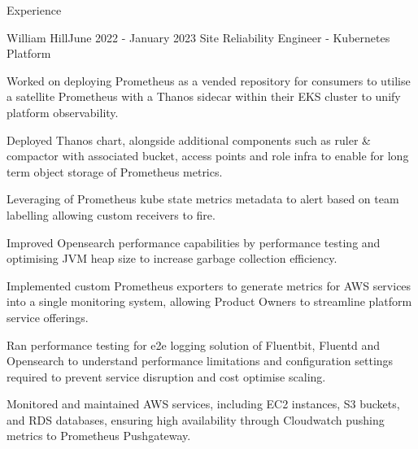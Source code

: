 \documentclass{resume} %
\begin{document}
\begin{rSection}{Experience}
\begin{rSubsection}{William Hill}{June 2022 - January 2023}
{Site Reliability Engineer - Kubernetes Platform}{}
\normalfont
\item Worked on deploying Prometheus as a vended repository for consumers to utilise a satellite Prometheus with a Thanos sidecar within their EKS cluster to unify platform observability. %
\item Deployed Thanos chart, alongside additional components such as ruler \& compactor with associated bucket, access points and role infra to enable for long term object storage of Prometheus metrics. %
\item Leveraging of Prometheus kube state metrics metadata to alert based on team labelling allowing custom receivers to fire. %
\item Improved Opensearch performance capabilities by performance testing and optimising JVM heap size to increase garbage collection efficiency. %
\item Implemented custom Prometheus exporters to generate metrics for AWS services into a single monitoring system, allowing Product Owners to streamline platform service offerings. %
\item Ran performance testing for e2e logging solution of Fluentbit, Fluentd and Opensearch to understand performance limitations and configuration settings required to prevent service disruption and cost optimise scaling. %
\item Monitored and maintained AWS services, including EC2 instances, S3 buckets, and RDS databases, ensuring high availability through Cloudwatch pushing metrics to Prometheus Pushgateway. %
\normalfont

\end{rSubsection}


\end{rSection}
\end{document}
